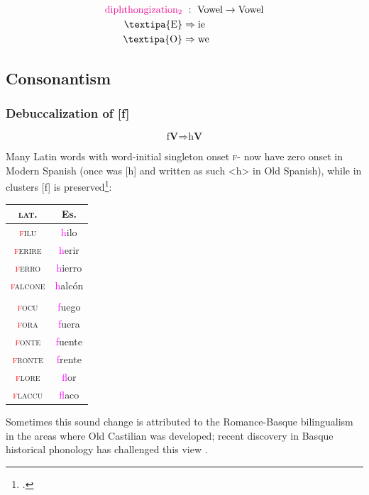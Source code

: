 \documentclass{report}[12pt]
\begin{document}
\begin{tcolorbox}
  \begin{align*}
    \text{\textcolor{magenta}{diphthongization$_2$}} &\ :\ \text{Vowel} \rightarrow \text{Vowel} \\
    \text{\textipa{E}} & \Rightarrow \text{ie} \\
    \text{\textipa{O}} & \Rightarrow \text{we} \\
  \end{align*}
\end{tcolorbox}

\subsection{Consonantism}

\subsubsection{Debuccalization of [f]}

\begin{tcolorbox}
  \[ \text{f}\textbf{V} \Rightarrow \text{h}\textbf{V} \]
\end{tcolorbox}

Many Latin words with word-initial singleton onset \textsc{f}- now have zero onset in Modern Spanish (once was [h] and written as such <h> in Old Spanish), while in clusters [f] is preserved\footcite[p.~50]{romance_his}:
\begin{center}
\begin{tabular}{c c}
  \textsc{lat.} & Es. \\
  \hline
  \textsc{\textcolor{red}{f}ilu} & \textcolor{magenta}{h}ilo \\
  \textsc{\textcolor{red}{f}erire} & \textcolor{magenta}{h}erir \\
  \textsc{\textcolor{red}{f}erro} & \textcolor{magenta}{h}ierro \\
  \textsc{\textcolor{red}{f}alcone} & \textcolor{magenta}{h}alcón \\
                & \\
  \textsc{\textcolor{red}{f}ocu} & \textcolor{magenta}{f}uego \\
  \textsc{\textcolor{red}{f}ora} & \textcolor{magenta}{f}uera \\
  \textsc{\textcolor{red}{f}onte} & \textcolor{magenta}{f}uente \\
  \textsc{\textcolor{red}{f}ronte} & \textcolor{magenta}{f}rente \\
  \textsc{\textcolor{red}{f}lore} & \textcolor{magenta}{f}lor \\
  \textsc{\textcolor{red}{f}laccu} & \textcolor{magenta}{f}laco \\
\end{tabular}
\end{center}
Sometimes this sound change is attributed to the Romance-Basque bilingualism in the areas where Old Castilian was developed; recent discovery in Basque historical phonology has challenged this view \parencite{manterola_hualde}.
\end{document}
